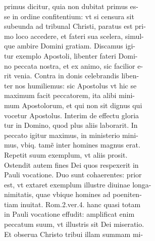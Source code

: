 \documentclass{article}
\begin{document}
\begin{pages}
                primus dicitur, quia non dubitat primus es- \\
                se in ordine confitentium: vt si censura sit \\
                subeunda ad tribunal Christi, paratus est pri- \\
                mo loco accedere, et fateri sua scelera, simul- \\
                que ambire Domini gratiam. Discamus igi- \\
                tur exemplo Apostoli, libenter fateri Domi- \\
                no peccata nostra, et ex animo, sic facilior e- \\
                rit venia. Contra in donis celebrandis liben- \\
                ter nos humiliemus: sic Apostolus vt hic se \\
                maximum facit peccatorem, ita alibi mini- \\
                mum Apostolorum, et qui non sit dignus qui \\
                vocetur Apostolus. Interim de effectu gloria \\
                tur in Domino, quod plus aliis laborarit. In \\
                peccato igitur maximus, in ministerio mini- \\
                mus, vbiq. tamẽ inter homines magnus erat. \\
                Repetit suum exemplum, vt aliis prosit. \\
                Ostendit autem fines Dei quos respexerit in \\
                Pauli vocatione. Duo sunt cohaerentes: prior \\
                est, vt extaret exemplum illustre diuinae longa- \\
                nimitatis, quae vbique homines ad poeniten- \\
                tiam inuitat. Rom.2.ver.4. hanc quasi totam \\
                in Pauli vocatione effudit: amplificat enim \\
                peccatum suum, vt illustris sit Dei miseratio. \\
                Et obserua Christo tribui illam summam mi- \\

\end{pages}
\end{document}
